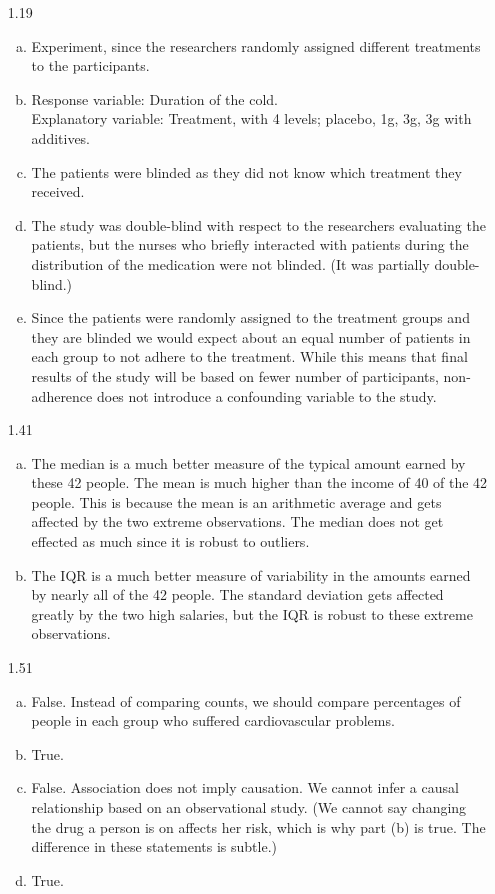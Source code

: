 \documentclass[11pt]{article}
\newenvironment{parts}{
\vspace{-0.25cm}
\begin{enumerate}[(a)]
\setlength{\itemsep}{0mm}
}
{\end{enumerate}
}
\begin{document}
\begin{enumerate}

\item[1.19] 
\begin{parts}
\item Experiment, since the researchers randomly assigned different treatments to the participants.
\item Response variable: Duration of the cold. \\
Explanatory variable: Treatment, with 4 levels; placebo, 1g, 3g, 3g with additives.
\item The patients were blinded as they did not know which treatment they received.
\item The study was double-blind with respect to the researchers evaluating the patients, but the nurses who briefly interacted with patients during the distribution of the medication were not blinded. (It was partially double-blind.)
\item Since the patients were randomly assigned to the treatment groups and they are blinded we would expect about an equal number of patients in each group to not adhere to the treatment. While this means that final results of the study will be based on fewer number of participants, non-adherence does not introduce a confounding variable to the study. 
\end{parts}

\item[1.41]
\begin{parts}
\item The median is a much better measure of the typical amount earned by these 42 people. The mean is much higher than the income of 40 of the 42 people. This is because the mean is an arithmetic average and gets affected by the two extreme observations. The median does not get effected as much since it is robust to outliers.
\item The IQR  is a much better measure of variability in the amounts earned by nearly all of the 42 people. The standard deviation gets affected greatly by the two high salaries, but the IQR is robust to these extreme observations.
\end{parts}

\item[1.51]
\begin{parts}
\item False. Instead of comparing counts, we should compare percentages of people in each group who suffered cardiovascular problems.
\item True.
\item False. Association does not imply causation. We cannot infer a causal relationship based on an observational study. (We cannot say changing the drug a person is on affects her risk, which is why part (b) is true. The difference in these statements is subtle.)
\item True.
\end{parts}


\end{enumerate}
\end{document}
